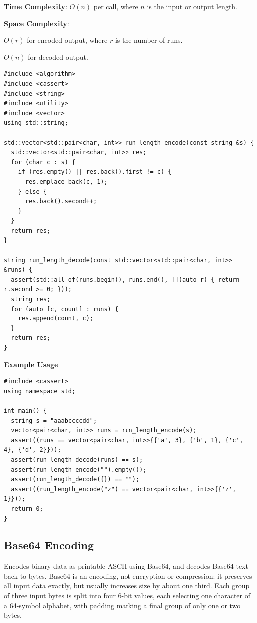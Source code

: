 \textbf{Time Complexity}: $O(n)$ per call, where $n$ is the input or output length.

\textbf{Space Complexity}:
\begin{compactitem}
  \item $O(r)$ for encoded output, where $r$ is the number of runs.
  \item $O(n)$ for decoded output.
\end{compactitem}

\begin{lstlisting}[style=cpp]
#include <algorithm>
#include <cassert>
#include <string>
#include <utility>
#include <vector>
using std::string;

std::vector<std::pair<char, int>> run_length_encode(const string &s) {
  std::vector<std::pair<char, int>> res;
  for (char c : s) {
    if (res.empty() || res.back().first != c) {
      res.emplace_back(c, 1);
    } else {
      res.back().second++;
    }
  }
  return res;
}

string run_length_decode(const std::vector<std::pair<char, int>> &runs) {
  assert(std::all_of(runs.begin(), runs.end(), [](auto r) { return r.second >= 0; }));
  string res;
  for (auto [c, count] : runs) {
    res.append(count, c);
  }
  return res;
}
\end{lstlisting}
\textbf{Example Usage}\par
\begin{lstlisting}[style=cpp]
#include <cassert>
using namespace std;

int main() {
  string s = "aaabccccdd";
  vector<pair<char, int>> runs = run_length_encode(s);
  assert((runs == vector<pair<char, int>>{{'a', 3}, {'b', 1}, {'c', 4}, {'d', 2}}));
  assert(run_length_decode(runs) == s);
  assert(run_length_encode("").empty());
  assert(run_length_decode({}) == "");
  assert((run_length_encode("z") == vector<pair<char, int>>{{'z', 1}}));
  return 0;
}
\end{lstlisting}
\subsection{Base64 Encoding}
\label{sec:3.8.3}
Encodes binary data as printable ASCII using Base64, and decodes Base64 text back to bytes. Base64 is an encoding, not encryption or compression: it preserves all input data exactly, but usually increases size by about one third. Each group of three input bytes is split into four 6-bit values, each selecting one character of a 64-symbol alphabet, with \inlinecode{=} padding marking a final group of only one or two bytes.

